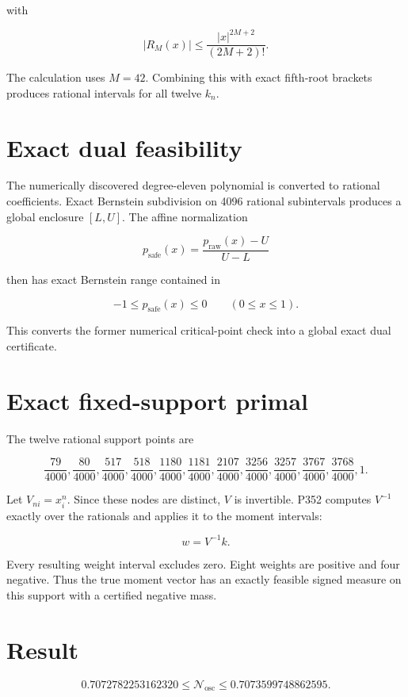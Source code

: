 \documentclass[11pt,a4paper,openany]{report}
\begin{document}
with

\[
|R_M(x)|
\leq
\frac{|x|^{2M+2}}{(2M+2)!}.
\]

The calculation uses \(M=42\). Combining this with exact fifth-root brackets produces rational intervals for all twelve \(k_n\).

\section{Exact dual feasibility}

The numerically discovered degree-eleven polynomial is converted to rational coefficients. Exact Bernstein subdivision on 4096 rational subintervals produces a global enclosure \([L,U]\). The affine normalization

\[
p_{\mathrm{safe}}(x)=
\frac{p_{\mathrm{raw}}(x)-U}{U-L}
\]

then has exact Bernstein range contained in

\[
-1\leq p_{\mathrm{safe}}(x)\leq0
\qquad (0\leq x\leq1).
\]

This converts the former numerical critical-point check into a global exact dual certificate.

\section{Exact fixed-support primal}

The twelve rational support points are

\[
\frac{79}{4000},\frac{80}{4000},
\frac{517}{4000},\frac{518}{4000},
\frac{1180}{4000},\frac{1181}{4000},
\frac{2107}{4000},
\frac{3256}{4000},\frac{3257}{4000},
\frac{3767}{4000},\frac{3768}{4000},1.
\]

Let \(V_{ni}=x_i^n\). Since these nodes are distinct, \(V\) is invertible. P352 computes \(V^{-1}\) exactly over the rationals and applies it to the moment intervals:

\[
w=V^{-1}k.
\]

Every resulting weight interval excludes zero. Eight weights are positive and four negative. Thus the true moment vector has an exactly feasible signed measure on this support with a certified negative mass.

\section{Result}

\[
\boxed{
0.7072782253162320
\leq \mathcal N_{\mathrm{osc}}
\leq 0.7073599748862595
}.
\]
\end{document}
